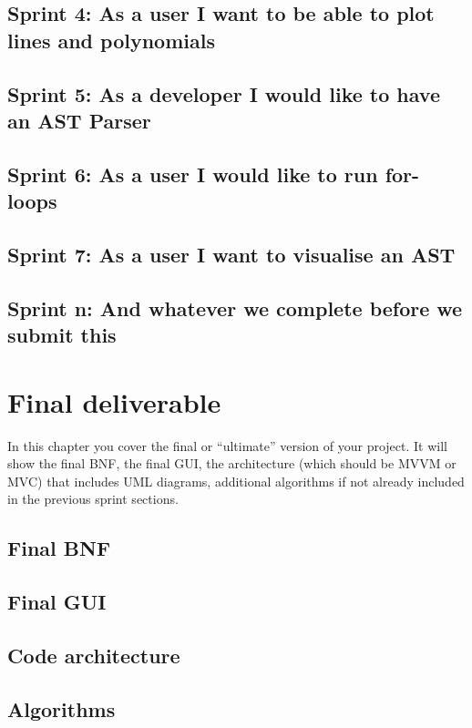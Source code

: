 \documentclass[a4paper, oneside, 11pt]{report}
\begin{document}
\section{Sprint 4: As a user I want to be able to plot lines and polynomials}
\section{Sprint 5: As a developer I would like to have an AST Parser}
\section{Sprint 6: As a user I would like to run for-loops}
\section{Sprint 7: As a user I want to visualise an AST}
\section{Sprint n: And whatever we complete before we submit this}



\chapter{Final deliverable}\label{Impl}

In this chapter you cover the final or ``ultimate'' version of your project. It will show the final BNF, the final GUI, the architecture (which should be MVVM or MVC) that includes UML diagrams, additional algorithms if not already included in the previous sprint sections.

\section{Final BNF}

\section{Final GUI}

\section{Code architecture}

\section{Algorithms}
\end{document}
